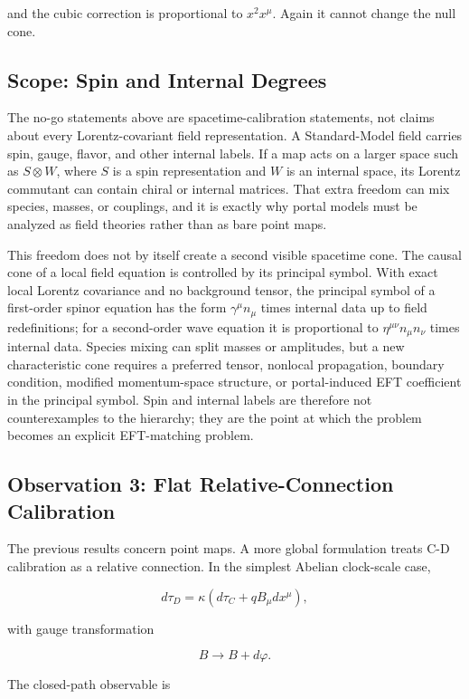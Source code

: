 \documentclass[11pt]{article}
\begin{document}
and the cubic correction is proportional to \(x^2x^\mu\). Again it cannot change the null cone.


\subsection{Scope: Spin and Internal Degrees}


The no-go statements above are spacetime-calibration statements, not claims about every Lorentz-covariant field representation. A Standard-Model field carries spin, gauge, flavor, and other internal labels. If a map acts on a larger space such as \(S\otimes W\), where \(S\) is a spin representation and \(W\) is an internal space, its Lorentz commutant can contain chiral or internal matrices. That extra freedom can mix species, masses, or couplings, and it is exactly why portal models must be analyzed as field theories rather than as bare point maps.


This freedom does not by itself create a second visible spacetime cone. The causal cone of a local field equation is controlled by its principal symbol. With exact local Lorentz covariance and no background tensor, the principal symbol of a first-order spinor equation has the form \(\gamma^\mu n_\mu\) times internal data up to field redefinitions; for a second-order wave equation it is proportional to \(\eta^{\mu\nu}n_\mu n_\nu\) times internal data. Species mixing can split masses or amplitudes, but a new characteristic cone requires a preferred tensor, nonlocal propagation, boundary condition, modified momentum-space structure, or portal-induced EFT coefficient in the principal symbol. Spin and internal labels are therefore not counterexamples to the hierarchy; they are the point at which the problem becomes an explicit EFT-matching problem.


\subsection{Observation 3: Flat Relative-Connection Calibration}


The previous results concern point maps. A more global formulation treats C-D calibration as a relative connection. In the simplest Abelian clock-scale case,


\[
d\tau_D=\kappa(d\tau_C+qB_\mu dx^\mu),
\]


with gauge transformation


\[
B\to B+d\varphi .
\]


The closed-path observable is
\end{document}
